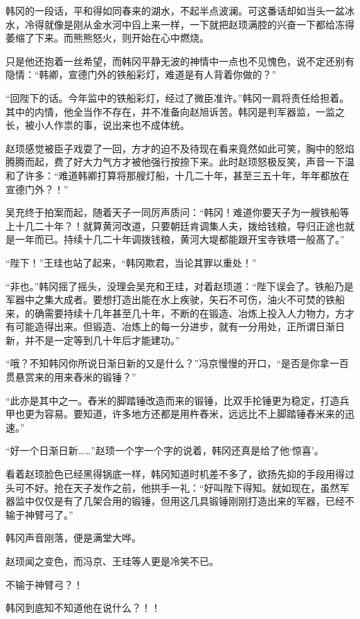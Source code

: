 韩冈的一段话，平和得如同春来的湖水，不起半点波澜。可这番话却如当头一盆冰水，冷得就像是刚从金水河中舀上来一样，一下就把赵顼满腔的兴奋一下都给冻得萎缩了下来。而熊熊怒火，则开始在心中燃烧。

只是他还抱着一丝希望，而韩冈平静无波的神情中一点也不见愧色，说不定还别有隐情：“韩卿，宣德门外的铁船彩灯，难道是有人背着你做的？”

“回陛下的话。今年监中的铁船彩灯，经过了微臣准许。”韩冈一肩将责任给担着。其中的内情，他全当作不存在，并不准备向赵旭诉苦。韩冈是判军器监，一监之长，被小人作祟的事，说出来也不成体统。

赵顼感觉被臣子戏耍了一回，方才的迫不及待现在看来竟然如此可笑，胸中的怒焰腾腾而起，费了好大力气方才被他强行按捺下来。此时赵顼怒极反笑，声音一下温和了许多：“难道韩卿打算将那艘灯船，十几二十年，甚至三五十年，年年都放在宣德门外？！”

吴充终于拍案而起，随着天子一同厉声质问：“韩冈！难道你要天子为一艘铁船等上十几二十年？！就算黄河改道，只要朝廷肯调集人夫，拨给钱粮，导归正途也就是一年而已。持续十几二十年调拨钱粮，黄河大堤都能跟开宝寺铁塔一般髙了。”

“陛下！”王珪也站了起来，“韩冈欺君，当论其罪以重处！”

“非也。”韩冈摇了摇头，没理会吴充和王珪，对着赵顼道：“陛下误会了。铁船乃是军器中之集大成者。要想打造出能在水上疾驶，矢石不可伤，油火不可焚的铁船来，的确需要持续十几年甚至几十年，不断的在锻造、冶炼上投入人力物力，方才有可能造得出来。但锻造、冶炼上的每一分进步，就有一分用处，正所谓日渐日新，并不是一定等到几十年后才能建功。”

“哦？不知韩冈你所说日渐日新的又是什么？”冯京慢慢的开口，“是否是你拿一百贯悬赏来的用来舂米的锻锤？”

“此亦是其中之一。舂米的脚踏锤改造而来的锻锤，比双手抡锤更为稳定，打造兵甲也更为容易。要知道，许多地方还都是用杵舂米，远远比不上脚踏锤舂米来的迅速。”

“好一个日渐日新……”赵顼一个字一个字的说着，韩冈还真是给了他‘惊喜’。

看着赵顼脸色已经黑得锅底一样，韩冈知道时机差不多了，欲扬先抑的手段用得过头可不好。抢在天子发作之前，他拱手一礼：“好叫陛下得知。就如现在，虽然军器监中仅仅是有了几架合用的锻锤，但用这几具锻锤刚刚打造出来的军器，已经不输于神臂弓了。”

韩冈声音刚落，便是满堂大哗。

赵顼闻之变色，而冯京、王珪等人更是冷笑不已。

不输于神臂弓？！

韩冈到底知不知道他在说什么？！！


